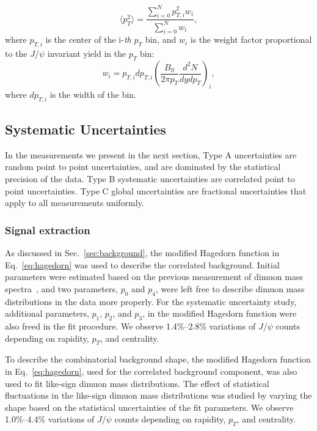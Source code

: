 \documentclass[twocolumn,letterpaper,aps,prc,longbibliography,superscriptaddress,nofootinbib,floatfix]{revtex4-1}
\newcommand{\pt}{\mbox{$p_T$}\xspace}
\newcommand{\meanptsq}{\mbox{$\langle p_T^2 \rangle$}\xspace}
\newcommand{\jpsi}{\mbox{$J/\psi$}\xspace}
\begin{document}
\begin{equation}
    \meanptsq = \frac{\sum \limits^{N}_{i=0}p_{T,i}^2 w_{i}}{\sum 
\limits^{N}_{i=0} w_{i}},
\end{equation}
where $p_{T,i}$ is the center of the i-\textit{th} \pt bin, and $w_i$ is 
the weight factor proportional to the \jpsi invariant yield in the \pt 
bin:
\begin{equation}
\label{eq:weight}
    w_i = p_{T,i} dp_{T,i} \left( \frac{B_{ll}}{2\pi p_T} 
\frac{d^{2}N}{dydp_T} \right)_i,
\end{equation}
where $dp_{T,i}$ is the width of the bin.

\subsection{Systematic Uncertainties}
\label{systunc}

In the measurements we present in the next section, Type A uncertainties 
are random point to point uncertainties, and are dominated by the 
statistical precision of the data.  Type B systematic uncertainties are 
correlated point to point uncertainties.  Type C global uncertainties 
are fractional uncertainties that apply to all measurements uniformly.

\subsubsection{Signal extraction}

As discussed in Sec.~\ref{sec:background}, the modified Hagedorn 
function in Eq.~\ref{eq:hagedorn} was used to describe the correlated 
background. Initial parameters were estimated based on the previous 
measurement of dimuon mass spectra~\cite{Aidala:2018ajl, Leung:2019vbb}, 
and two parameters, $p_0$ and $p_4$, were left free to describe dimuon 
mass distributions in the data more properly. For the systematic 
uncertainty study, additional parameters, $p_1$, $p_2$, and $p_3$, in 
the modified Hagedorn function were also freed in the fit procedure. We 
observe 1.4\%--2.8\% variations of \jpsi counts depending on rapidity, 
\pt, and centrality.

To describe the combinatorial background shape, the modified Hagedorn 
function in Eq.~\ref{eq:hagedorn}, used for the correlated background 
component, was also used to fit like-sign dimuon mass distributions. The 
effect of statistical fluctuations in the like-sign dimuon mass 
distributions was studied by varying the shape based on the statistical 
uncertainties of the fit parameters. We observe 1.0\%--4.4\% variations 
of \jpsi counts depending on rapidity, \pt, and centrality.
\end{document}

